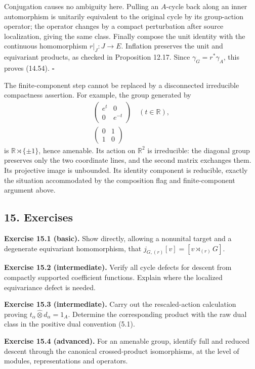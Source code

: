 \documentclass[
  11pt,
]{article}
\begin{document}
Conjugation causes no ambiguity here. Pulling an \(A\)-cycle back along
an inner automorphism is unitarily equivalent to the original cycle by
its group-action operator; the operator changes by a compact
perturbation after source localization, giving the same class. Finally
compose the unit identity with the continuous homomorphism
\(r|_J:J\to E\). Inflation preserves the unit and equivariant products,
as checked in Proposition 12.17. Since \(\gamma_G=r^*\gamma_A\), this
proves (14.54). \(\square\)

The finite-component step cannot be replaced by a disconnected
irreducible compactness assertion. For example, the group generated by
\[
\begin{gathered}
\begin{pmatrix}e^t&0\\0&e^{-t}\end{pmatrix}
\quad(t\in\mathbb R),\\
\begin{pmatrix}0&1\\1&0\end{pmatrix}
\end{gathered}
\tag{14.57}
\] is \(\mathbb R\rtimes\{\pm1\}\), hence amenable. Its action on
\(\mathbb R^2\) is irreducible: the diagonal group preserves only the
two coordinate lines, and the second matrix exchanges them. Its
projective image is unbounded. Its identity component is reducible,
exactly the situation accommodated by the composition flag and
finite-component argument above.

\subsection{15. Exercises}\label{exercises}

\textbf{Exercise 15.1 (basic).} Show directly, allowing a nonunital
target and a degenerate equivariant homomorphism, that
\(j_{G,(r)}[v]=[v\rtimes_{(r)}G]\).

\textbf{Exercise 15.2 (intermediate).} Verify all cycle defects for
descent from compactly supported coefficient functions. Explain where
the localized equivariance defect is needed.

\textbf{Exercise 15.3 (intermediate).} Carry out the rescaled-action
calculation proving \(t_\alpha\widehat\otimes d_\alpha=1_A\). Determine
the corresponding product with the raw dual class in the positive dual
convention (5.1).

\textbf{Exercise 15.4 (advanced).} For an amenable group, identify full
and reduced descent through the canonical crossed-product isomorphisms,
at the level of modules, representations and operators.
\end{document}
